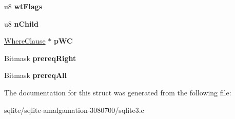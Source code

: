 \begin{DoxyCompactItemize}
\item 
\hypertarget{struct_where_term_a5a3ba67885262f1bb9169dcaff0f91b1}{u8 {\bfseries wt\+Flags}}\label{struct_where_term_a5a3ba67885262f1bb9169dcaff0f91b1}

\item 
\hypertarget{struct_where_term_af83cf7bae7760b9b1ca398338a35c32a}{u8 {\bfseries n\+Child}}\label{struct_where_term_af83cf7bae7760b9b1ca398338a35c32a}

\item 
\hypertarget{struct_where_term_a1fb0a9ede5a12d6d2f7886431b348fb3}{\hyperlink{struct_where_clause}{Where\+Clause} $\ast$ {\bfseries p\+W\+C}}\label{struct_where_term_a1fb0a9ede5a12d6d2f7886431b348fb3}

\item 
\hypertarget{struct_where_term_a1274011fa1ef0639284b7944f4570e67}{Bitmask {\bfseries prereq\+Right}}\label{struct_where_term_a1274011fa1ef0639284b7944f4570e67}

\item 
\hypertarget{struct_where_term_a49b700336b005067352366cfc40de07f}{Bitmask {\bfseries prereq\+All}}\label{struct_where_term_a49b700336b005067352366cfc40de07f}

\end{DoxyCompactItemize}


The documentation for this struct was generated from the following file\+:\begin{DoxyCompactItemize}
\item 
sqlite/sqlite-\/amalgamation-\/3080700/sqlite3.\+c\end{DoxyCompactItemize}
